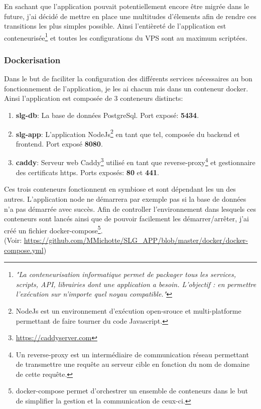 \newpara

En sachant que l'application pouvait potentiellement encore être migrée dans le future, j'ai décidé de mettre en place une multitudes d'élements afin de rendre ces transitions les plus simples possible. Ainsi l'entièreté de l'application est conteneurisée\footnote{\textit{"La conteneurisation informatique permet de packager tous les services, scripts, API, librairies dont une application a besoin. L’objectif : en permettre l’exécution sur n’importe quel noyau compatible."}\cite{conteneurisation}} et toutes les configurations du VPS sont au maximum scriptées. 

\subsubsection{Dockerisation}
Dans le but de faciliter la configuration des différents services nécessaires au bon fonctionnement de l'application, je les ai chacun mis dans un conteneur docker. Ainsi l'application est composée de 3 conteneurs distincts: 

\newpara

\begin{enumerate}
  \item \textbf{slg-db}: La base de données PostgreSql. Port exposé: \textbf{5434}.
  \item \textbf{slg-app}: L'application NodeJs\footnote{NodeJs est un environnement d'exécution open-srouce et multi-platforme permettant de faire tourner du code Javascript.} en tant que tel, composée du backend et frontend. Port exposé \textbf{8080}. 
  \item \textbf{caddy}: Serveur web Caddy\footnote{\url{https://caddyserver.com}} utilisé en tant que reverse-proxy\footnote{Un reverse-proxy est un intermédiaire de communication réseau permettant de transmettre une requête au serveur cible en fonction du nom de domaine de cette requête.} et gestionnaire des certificats https. Ports exposés: \textbf{80} et \textbf{441}.
\end{enumerate}

\newpage

Ces trois conteneurs fonctionnent en symbiose et sont dépendant les un des autres. L'application node ne démarrera par exemple pas si la base de données n'a pas démarrée avec succès. Afin de controller l'environnement dans lesquels ces conteneurs sont lancés ainsi que de pouvoir facilement les démarrer/arrêter, j'ai créé un fichier docker-compose\footnote{docker-compose permet d'orchestrer un ensemble de conteneurs dans le but de simplifier la gestion et la communication de ceux-ci.}. \\ (Voir: \url{https://github.com/MMichotte/SLG_APP/blob/master/docker/docker-compose.yml})

